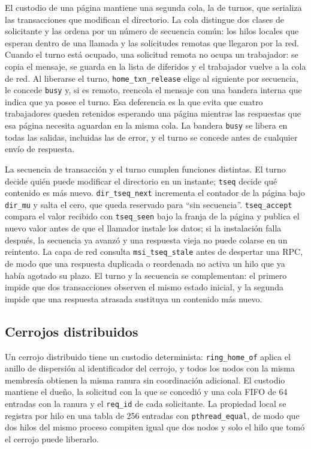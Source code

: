 El custodio de una página mantiene una segunda cola, la de turnos, que serializa las transacciones que modifican el directorio. La cola distingue dos clases de solicitante y las ordena por un número de secuencia común: los hilos locales que esperan dentro de una llamada y las solicitudes remotas que llegaron por la red. Cuando el turno está ocupado, una solicitud remota no ocupa un trabajador: se copia el mensaje, se guarda en la lista de diferidos y el trabajador vuelve a la cola de red. Al liberarse el turno, \texttt{home\_txn\_release} elige al siguiente por secuencia, le concede \texttt{busy} y, si es remoto, reencola el mensaje con una bandera interna que indica que ya posee el turno. Esa deferencia es la que evita que cuatro trabajadores queden retenidos esperando una página mientras las respuestas que esa página necesita aguardan en la misma cola. La bandera \texttt{busy} se libera en todas las salidas, incluidas las de error, y el turno se concede antes de cualquier envío de respuesta.

La secuencia de transacción y el turno cumplen funciones distintas. El turno decide quién puede modificar el directorio en un instante; \texttt{tseq} decide qué contenido es más nuevo. \texttt{dir\_tseq\_next} incrementa el contador de la página bajo \texttt{dir\_mu} y salta el cero, que queda reservado para ``sin secuencia''. \texttt{tseq\_accept} compara el valor recibido con \texttt{tseq\_seen} bajo la franja de la página y publica el nuevo valor antes de que el llamador instale los datos; si la instalación falla después, la secuencia ya avanzó y una respuesta vieja no puede colarse en un reintento. La capa de red consulta \texttt{msi\_tseq\_stale} antes de despertar una RPC, de modo que una respuesta duplicada o reordenada no activa un hilo que ya había agotado su plazo. El turno y la secuencia se complementan: el primero impide que dos transacciones observen el mismo estado inicial, y la segunda impide que una respuesta atrasada sustituya un contenido más nuevo.

\subsection{Cerrojos distribuidos}

Un cerrojo distribuido tiene un custodio determinista: \texttt{ring\_home\_of} aplica el anillo de dispersión al identificador del cerrojo, y todos los nodos con la misma membresía obtienen la misma ranura sin coordinación adicional. El custodio mantiene el dueño, la solicitud con la que se concedió y una cola FIFO de 64 entradas con la ranura y el \texttt{req\_id} de cada solicitante. La propiedad local se registra por hilo en una tabla de 256 entradas con \texttt{pthread\_equal}, de modo que dos hilos del mismo proceso compiten igual que dos nodos y solo el hilo que tomó el cerrojo puede liberarlo.

